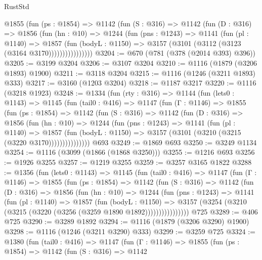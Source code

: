 \begin{lexlean}{RustStd}
\begin{coremodule}
            @1855
              (fun (ps : @1854) =>
              @1142
                (fun (S : @316) =>
                @1142
                  (fun (D : @316) =>
                  @1856
                    (fun (hn : @10) =>
                    @1244
                      (fun (pns : @1243) =>
                      @1141
                        (fun (pl : @1140) =>
                        @1857
                          (fun (bodyL : @1150) =>
                          @3157 (@3101 (@3112 (@3123 (@3164 @3170))))))))))))))))
@3204 := @670 (@781 (@378 (@2014 @393) @396))
@3205 := @3199 @3204
@3206 := @3107 @3204
@3210 := @1116 (@1879 (@3206 @1893) @1900)
@3211 := @3118 @3204
@3215 := @1116 (@1246 (@3211 @1893) @333)
@3217 := @3160 (@1203 @3204)
@3218 := @1187 @3217
@3220 := @1116 (@3218 @1923)
@3248 := @1334
    (fun (rty : @316) =>
    @1144
      (fun (lets0 : @1143) =>
      @1145
        (fun (tail0 : @416) =>
        @1147
          (fun (Γ : @1146) =>
          @1855
            (fun (ps : @1854) =>
            @1142
              (fun (S : @316) =>
              @1142
                (fun (D : @316) =>
                @1856
                  (fun (hn : @10) =>
                  @1244
                    (fun (pns : @1243) =>
                    @1141
                      (fun (pl : @1140) =>
                      @1857
                        (fun (bodyL : @1150) =>
                        @3157 (@3101 (@3210 (@3215 (@3220 @3170)))))))))))))))
    @693
@3249 := @1869 @693
@3250 := @3249 @1134
@3254 := @1116 (@3099 (@1866 (@1868 @3250)))
@3255 := @1216 @693
@3256 := @1926 @3255
@3257 := @1219 @3255
@3259 := @3257 @3165 @1822
@3288 := @1356
    (fun (lets0 : @1143) =>
    @1145
      (fun (tail0 : @416) =>
      @1147
        (fun (Γ : @1146) =>
        @1855
          (fun (ps : @1854) =>
          @1142
            (fun (S : @316) =>
            @1142
              (fun (D : @316) =>
              @1856
                (fun (hn : @10) =>
                @1244
                  (fun (pns : @1243) =>
                  @1141
                    (fun (pl : @1140) =>
                    @1857
                      (fun (bodyL : @1150) =>
                      @3157 (@3254 (@3210 (@3215 (@3220 (@3256 (@3259 @1890 @1892))))))))))))))))
    @725
@3289 := @406 @725
@3290 := @3289 @1892
@3294 := @1116 (@1879 (@3206 @3290) @1900)
@3298 := @1116 (@1246 (@3211 @3290) @333)
@3299 := @3259 @725
@3324 := @1380
    (fun (tail0 : @416) =>
    @1147
      (fun (Γ : @1146) =>
      @1855
        (fun (ps : @1854) =>
        @1142
          (fun (S : @316) =>
          @1142

\end{coremodule}
\end{lexlean}
